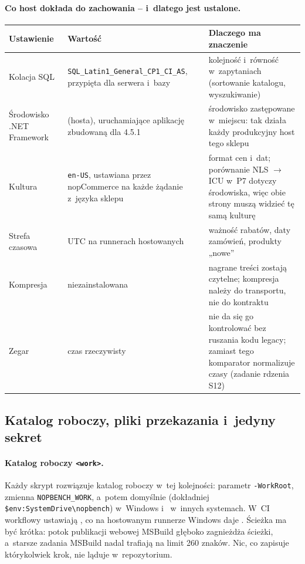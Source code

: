 \paragraph{Co host dokłada do zachowania -- i~dlatego jest ustalone.}

\begin{center}
\small
\begin{tabularx}{\linewidth}{@{}>{\raggedright\arraybackslash}p{2.6cm} >{\raggedright\arraybackslash}X >{\raggedright\arraybackslash}X@{}}
\toprule
Ustawienie & Wartość & Dlaczego ma znaczenie \\
\midrule
Kolacja SQL & \texttt{SQL\_Latin1\_General\_CP1\_CI\_AS}, przypięta dla serwera i~bazy &
  kolejność i~równość w~zapytaniach (sortowanie katalogu, wyszukiwanie) \\
Środowisko .NET Framework & 4.8 (hosta), uruchamiające aplikację zbudowaną dla 4.5.1 &
  środowisko zastępowane w~miejscu: tak działa każdy produkcyjny host tego sklepu \\
Kultura & \texttt{en-US}, ustawiana przez nopCommerce na każde żądanie z~języka sklepu &
  format cen i~dat; porównanie NLS $\rightarrow$ ICU w~P7 dotyczy środowiska, więc obie
  strony muszą widzieć tę samą kulturę \\
Strefa czasowa & UTC na runnerach hostowanych & ważność rabatów, daty zamówień, produkty
  „nowe” \\
Kompresja & niezainstalowana & nagrane treści zostają czytelne; kompresja należy do
  transportu, nie do kontraktu \\
Zegar & czas rzeczywisty & nie da się go kontrolować bez ruszania kodu legacy; zamiast
  tego komparator normalizuje czasy (zadanie rdzenia S12) \\
\bottomrule
\end{tabularx}
\end{center}


\subsection{Katalog roboczy, pliki przekazania i~jedyny sekret}\label{sec:bench-stan}

\paragraph{Katalog roboczy \texttt{<work>}.} Każdy skrypt rozwiązuje katalog roboczy
w~tej kolejności: parametr \texttt{-WorkRoot}, zmienna \texttt{NOPBENCH\_WORK}, a~potem
domyślnie  (dokładniej \texttt{\$env:SystemDrive\textbackslash{}nopbench})
w~Windows i~ w~innych systemach. W~CI workflowy ustawiają
, co na hostowanym
runnerze Windows daje . Ścieżka ma być krótka: potok publikacji
webowej MSBuild głęboko zagnieżdża ścieżki, a~starsze zadania MSBuild nadal trafiają na
limit 260 znaków. Nic, co zapisuje którykolwiek krok, nie ląduje w~repozytorium.

